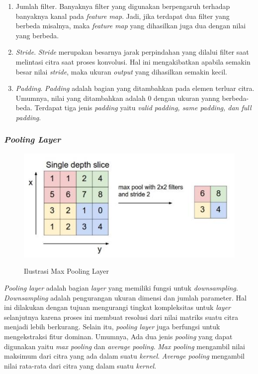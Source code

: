 \begin{enumerate}[nolistsep]
  \item Jumlah filter. Banyaknya filter yang digunakan berpengaruh terhadap banyaknya kanal pada \emph{feature map}. Jadi, jika terdapat dua filter yang berbeda misalnya, maka \emph{feature map} yang dihasilkan juga dua dengan nilai yang berbeda.
  \item \emph{Stride}. \emph{Stride} merupakan besarnya jarak perpindahan yang dilalui filter saat melintasi citra saat proses konvolusi. Hal ini mengakibatkan apabila semakin besar nilai \emph{stride}, maka ukuran \emph{output} yang dihasilkan semakin kecil. 
  \item \emph{Padding}. \emph{Padding} adalah bagian yang ditambahkan pada elemen terluar citra. Umumnya, nilai yang ditambahkan adalah 0 dengan ukuran yanng berbeda-beda. Terdapat tiga jenis \emph{padding} yaitu \emph{valid padding, same padding, dan full padding}. 
\end{enumerate}   

\subsubsection{\emph{Pooling Layer}}

\begin{figure} [ht] \centering  
  \includegraphics[scale=0.85]{gambar/max-pooling-layer.png}
  \caption{Ilustrasi Max Pooling Layer}
  \label{fig:Ilustrasi Max Pooling Layer}
  \parencite{MaxPoolingLayer}
\end{figure}

\emph{Pooling layer} adalah bagian \emph{layer} yang memiliki fungsi untuk \emph{downsampling}. \emph{Downsampling} adalah pengurangan ukuran dimensi dan jumlah parameter. Hal ini dilakukan dengan tujuan mengurangi tingkat kompleksitas untuk \emph{layer} selanjutnya karena proses ini membuat resolusi dari nilai matriks suatu citra menjadi lebih berkurang. Selain itu, \emph{pooling layer} juga berfungsi untuk mengekstraksi fitur dominan. Umumnya, Ada dua jenis \emph{pooling} yang dapat digunakan yaitu \emph{max pooling} dan \emph{average pooling}. \emph{Max pooling} mengambil nilai maksimum dari citra yang ada dalam suatu \emph{kernel}. \emph{Average pooling} mengambil nilai rata-rata dari citra yang dalam suatu \emph{kernel}. 

